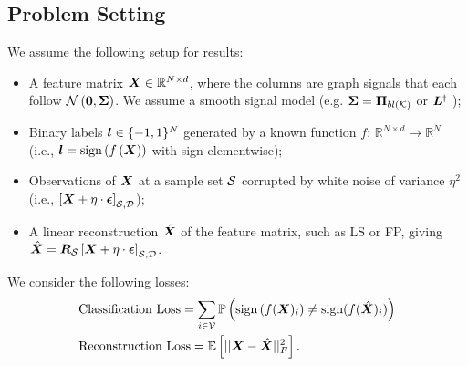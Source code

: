 \subsection{Problem Setting}
\label{sec:problem_setting}
We assume the following setup for  results: %
\begin{itemize}
    \item A feature matrix $\bm{X}\in\mathbb{R}^{N \times d}$, where the columns are  graph signals that each follow $\mathcal{N}\left(\bm{0},\bm{\Sigma}\right)$. We assume a smooth signal model (e.g. $\matr{\Sigma} = \projbl$ \cite{sripathmanathan2024impact} or $\bm{L}^{\dagger}$ \cite{dong2016learning});
    \item Binary labels $\bm{l} \in \{-1,1\}^{N}$ generated by a known function $f:\, \mathbb{R}^{N \times d}\to \mathbb{R}^{N}$  (i.e., $\bm{l} = \text{sign}\left(f\left(\bm{X}\right)\right)$ with sign elementwise);
    \item Observations of $\bm{X}$ at a sample set $\mathcal{S}$ corrupted by white noise of variance $\eta^{2}$ (i.e., $\msubgen[\set{S},\set{D}]{\matr{X} + \eta \cdot \matr{\epsilon}}$); %
    \item A linear reconstruction $\hat{\bm{X}}$ of the feature matrix, such as LS or FP, giving $\hat{\matr{X}} = \matr{R}_{\set{S}} \msubgen[\set{S},\set{D}]{\matr{X} + \eta \cdot \matr{\epsilon}}$.
\end{itemize}

We consider the following losses:
\begin{align}
    &\bs{\text{Classification Loss}} = {\sum_{i \in \set{V}}\prob{\text{sign}\left(f(\matr{X})_{i}\right) \neq \text{sign}(f(\hat{\matr{X}})_{i})}} \\
    &\text{Reconstruction Loss} = \expect{||{\vect{X} - \hat{\vect{X}}}||^{2}_{F}}.
\end{align}

